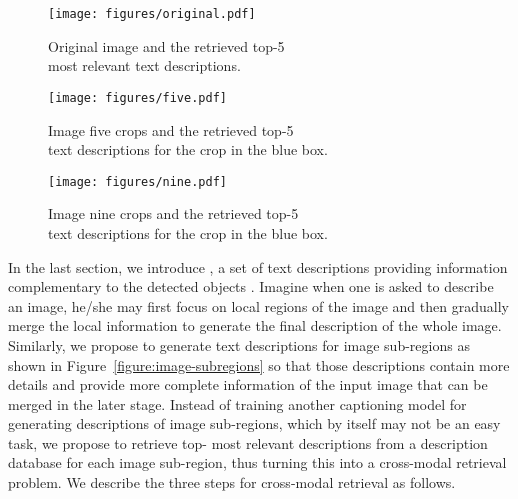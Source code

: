 \documentclass[10pt,twocolumn,letterpaper]{article}
\begin{document}
\begin{figure*}[t]
\begin{subfigure}[b]{.32\linewidth}
  \centering
  \texttt{[image: figures/original.pdf]}
  \caption{Original image and the retrieved top-5\\ most relevant text descriptions.}
  \label{figure:original}
\end{subfigure}
\begin{subfigure}[b]{.32\linewidth}
  \centering
  \texttt{[image: figures/five.pdf]}
  \caption{Image five crops and the retrieved top-5\\ text descriptions for the crop in the blue box.}
  \label{figure:five}
\end{subfigure}
\begin{subfigure}[b]{.32\linewidth}
  \centering
  \texttt{[image: figures/nine.pdf]}
  \caption{Image nine crops and the retrieved top-5\\ text descriptions for the crop in the blue box.}
  \label{figure:nine}
\end{subfigure}
\caption{Retrieved top-5 most relevant text descriptions for \textbf{(a)} the original image, \textbf{(b)} the image five crops, and \textbf{(c)} the image nine crops.
For five crops and nine crops, we show the retrieved text descriptions for the crop in the blue box.}
\label{figure:image-subregions}
\end{figure*}

In the last section, we introduce , a set of text descriptions providing information complementary to the detected objects .
Imagine when one is asked to describe an image, he/she may first focus on local regions of the image and then gradually merge the local information to generate the final description of the whole image.
Similarly, we propose to generate text descriptions for image sub-regions as shown in Figure~\ref{figure:image-subregions} so that those descriptions contain more details and provide more complete information of the input image that can be merged in the later stage.
Instead of training another captioning model for generating descriptions of image sub-regions, which by itself may not be an easy task, we propose to retrieve top- most relevant descriptions from a description database for each image sub-region, thus turning this into a cross-modal retrieval problem.
We describe the three steps for cross-modal retrieval as follows.
\end{document}
